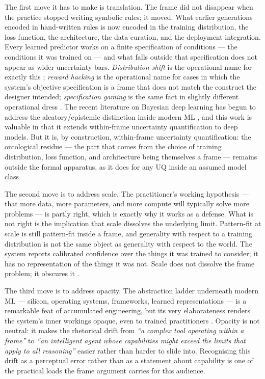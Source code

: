 \documentclass[11pt,a4paper]{article}
\begin{document}
The first move it has to make is translation. The frame did not
disappear when the practice stopped writing symbolic rules; it moved.
What earlier generations encoded in hand-written rules is now encoded in
the training distribution, the loss function, the architecture, the
data curation, and the deployment integration. Every learned predictor
works on a finite specification of conditions --- the conditions it was
trained on --- and what falls outside that specification does not appear
as wider uncertainty bars. \emph{Distribution shift} is the operational
name for exactly this \citep{QuioneroCandela2009}; \emph{reward hacking}
is the operational name for cases in which the system's objective
specification is a frame that does not match the construct the designer
intended; \emph{specification gaming} is the same fact in slightly
different operational dress \citep{Amodei2016,Christian2020}. The recent
literature on Bayesian deep learning has begun to address the
aleatory/epistemic distinction inside modern ML
\citep{KendallGal2017,HullermeierWaegeman2021}, and this work is valuable
in that it extends within-frame uncertainty quantification to deep
models. But it is, by construction, within-frame uncertainty
quantification: the ontological residue --- the part that comes from the
choice of training distribution, loss function, and architecture being
themselves a frame --- remains outside the formal apparatus, as it does
for any UQ inside an assumed model class.

The second move is to address scale. The practitioner's working
hypothesis --- that more data, more parameters, and more compute will
typically solve more problems --- is partly right, which is exactly why
it works as a defense. What is not right is the implication that scale
dissolves the underlying limit. Pattern-fit at scale is still pattern-fit
inside a frame, and generality with respect to a training distribution
is not the same object as generality with respect to the world. The
system reports calibrated confidence over the things it was trained to
consider; it has no representation of the things it was not. Scale does
not dissolve the frame problem; it obscures it \citep{Bender2021}.

The third move is to address opacity. The abstraction ladder underneath
modern ML --- silicon, operating systems, frameworks, learned
representations --- is a remarkable feat of accumulated engineering, but
its very elaborateness renders the system's inner workings opaque, even
to trained practitioners \citep{Burrell2016,DoshiVelezKim2017}. Opacity
is not neutral: it makes the rhetorical drift from \emph{``a complex tool
operating within a frame''} to \emph{``an intelligent agent whose
capabilities might exceed the limits that apply to all reasoning''}
easier rather than harder to slide into. Recognising this drift as a
perceptual error rather than as a statement about capability is one of
the practical loads the frame argument carries for this audience.
\end{document}
